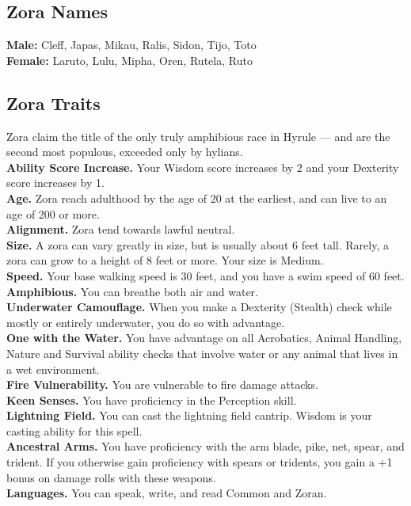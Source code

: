\documentclass[10pt,twoside,twocolumn,openany]{book}
\begin{document}
\subsection{Zora Names}

\textbf{Male:} Cleff, Japas, Mikau, Ralis, Sidon, Tijo, Toto \\
\textbf{Female:} Laruto, Lulu, Mipha, Oren, Rutela, Ruto 

\subsection{Zora Traits}
Zora claim the title of the only truly amphibious race in Hyrule — and are the second most populous, exceeded only by hylians.\\
\indent \textbf{Ability Score Increase.} Your Wisdom score increases by 2 and your Dexterity score increases by 1.\\
\indent \textbf{Age.} Zora reach adulthood by the age of 20 at the earliest, and can live to an age of 200 or more.\\
\indent \textbf{Alignment.} Zora tend towards lawful neutral.\\
\indent \textbf{Size.} A zora can vary greatly in size, but is usually about 6 feet tall. Rarely, a zora can grow to a height of 8 feet or more. Your size is Medium.\\
\indent \textbf{Speed.} Your base walking speed is 30 feet, and you have a swim speed of 60 feet.\\
\indent \textbf{Amphibious.} You can breathe both air and water.\\
\indent \textbf{Underwater Camouflage.} When you make a Dexterity (Stealth) check while mostly or entirely underwater, you do so with advantage. \\
\indent \textbf{One with the Water.} You have advantage on all Acrobatics, Animal Handling, Nature and Survival ability checks that involve water or any animal that lives in a wet environment.\\
\indent \textbf{Fire Vulnerability.} You are vulnerable to fire damage attacks.\\
\indent \textbf{Keen Senses.} You have proficiency in the Perception skill.\\
\indent \textbf{Lightning Field.} You can cast the lightning field cantrip. Wisdom is your casting ability for this spell. \\
\indent \textbf{Ancestral Arms.} You have proficiency with the arm blade, pike, net, spear, and trident. If you otherwise gain proficiency with spears or tridents, you gain a +1 bonus on damage rolls with these weapons.\\
\indent \textbf{Languages.} You can speak, write, and read Common and Zoran.
\end{document}
